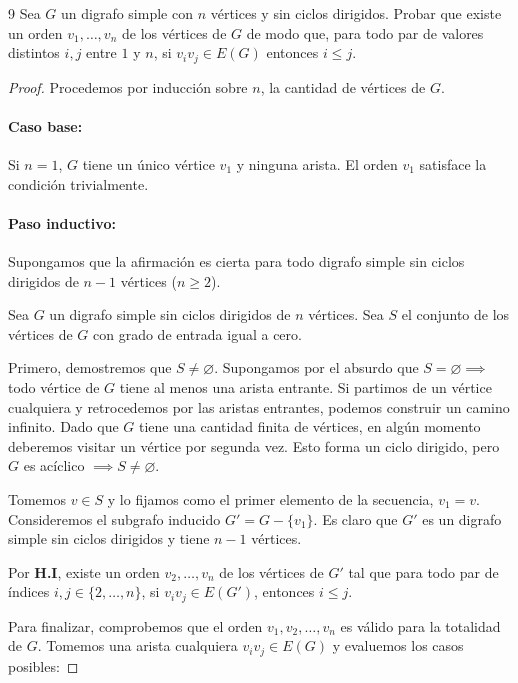 \begin{ejercicio}{9}
	Sea \( G \) un digrafo simple con \( n \) vértices y sin ciclos dirigidos. Probar que existe un orden \( v_1, \ldots, v_n \) de los vértices de \( G \) de modo que, para todo par de valores distintos \( i, j \) entre \( 1 \) y \( n \), si \( v_i v_j \in E(G) \) entonces \( i \leq j \).
\end{ejercicio}
\begin{proof}
	Procedemos por inducción sobre \( n \), la cantidad de vértices de \( G \).

	\paragraph{Caso base:} Si \( n = 1 \), \( G \) tiene un único vértice \( v_1 \) y ninguna arista. El orden \( v_1 \) satisface la condición trivialmente.

	\paragraph{Paso inductivo:} Supongamos que la afirmación es cierta para todo digrafo simple sin ciclos dirigidos de \( n-1 \) vértices (\( n \ge 2 \)).

	Sea \( G \) un digrafo simple sin ciclos dirigidos de \( n \) vértices. Sea \( S \) el conjunto de los vértices de \( G \) con grado de entrada igual a cero.

	Primero, demostremos que \( S \neq \varnothing \). Supongamos por el absurdo que \( S = \varnothing \implies \) todo vértice de \( G \) tiene al menos una arista entrante. Si partimos de un vértice cualquiera y retrocedemos por las aristas entrantes, podemos construir un camino infinito. Dado que \( G \) tiene una cantidad finita de vértices, en algún momento deberemos visitar un vértice por segunda vez. Esto forma un ciclo dirigido, pero \( G \) es acíclico \( \implies S \neq \varnothing \).

	Tomemos \( v \in S \) y lo fijamos como el primer elemento de la secuencia, \( v_1 = v \). Consideremos el subgrafo inducido \( G' = G - \{v_1\} \). Es claro que \( G' \) es un digrafo simple sin ciclos dirigidos y tiene \( n-1 \) vértices.

	Por \textbf{H.I}, existe un orden \( v_2, \ldots, v_n \) de los vértices de \( G' \) tal que para todo par de índices \( i, j \in \{2, \ldots, n\} \), si \( v_i v_j \in E(G') \), entonces \( i \le j \).

	Para finalizar, comprobemos que el orden \( v_1, v_2, \ldots, v_n \) es válido para la totalidad de \( G \). Tomemos una arista cualquiera \( v_i v_j \in E(G) \) y evaluemos los casos posibles:


\end{proof}
